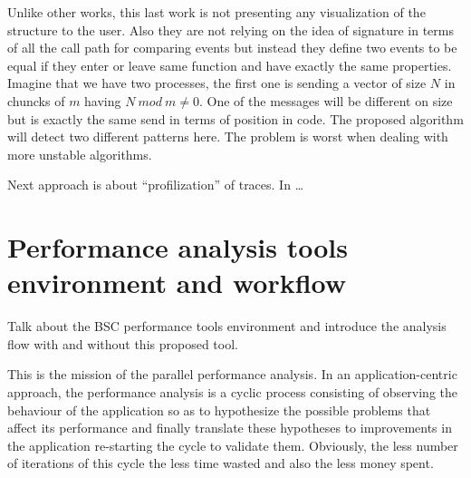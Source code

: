 \documentclass[12pt]{report}
\begin{document}
Unlike other works, this last work is not presenting any visualization of the
structure to the user. Also they are not relying on the idea of signature in
terms of all the call path for comparing events but instead they define two 
events to be equal if they enter or leave same function and have exactly the
same properties. Imagine that we have two processes, the first one is sending a
vector of size $N$ in chuncks of $m$ having $N\:mod\: m \neq 0$. One of the messages
will be different on size but is exactly the same send in terms of position in
code. The proposed algorithm will detect two different patterns here. The
problem is worst when dealing with more unstable algorithms.

Next approach is about “profilization” of traces.
In \cite{saviankou2015cube} 
\dots

\section{Performance analysis tools environment and workflow}\label{s:pt_evironment}


Talk about the BSC performance tools environment and introduce the analysis flow
with and without this proposed tool.

This is the mission of the parallel performance analysis. In an application-centric
approach, the performance analysis is a cyclic process consisting of observing 
the behaviour of the application so as to hypothesize the possible problems that 
affect its performance and finally translate these hypotheses to improvements in
the application re-starting the cycle to validate them. Obviously, the less number 
of iterations of this cycle the less time wasted and also the less money spent.






\end{document}
